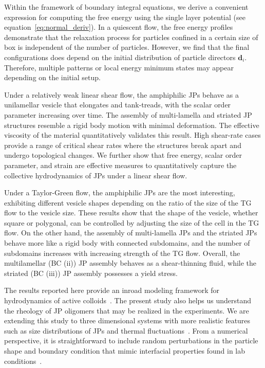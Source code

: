 \documentclass[prb,preprint,showpacs,preprintnumbers,amsmath,amssymb,longbibliography]{revtex4-1}
\newcommand{\dd}{\mathbf{d}}
\begin{document}
Within the framework of boundary integral equations, we derive a
convenient expression for computing the free energy using the single
layer potential (see equation~\eqref{eq:normal_deriv}). In a quiescent
flow, the free energy profiles demonstrate that the relaxation process
for particles confined in a certain size of box is independent of the
number of particles. However, we find that the final configurations does
depend on the initial distribution of particle directors $\dd_i$.
Therefore, multiple patterns or local energy minimum states may appear
depending on the initial setup.

Under a relatively weak linear shear flow, the amphiphilic JPs behave as
a unilamellar vesicle that elongates and tank-treads, with the scalar
order parameter increasing over time. The assembly of multi-lamella and
striated JP structures resemble a rigid body motion with minimal
deformation. The effective viscosity of the material quantitatively
validates this result. High shear-rate cases provide a range of critical
shear rates where the structures break apart and undergo topological
changes. We further show that free energy, scalar order parameter, and
strain are effective measures to quantitatively capture the collective hydrodynamics of
JPs under a linear shear flow.

Under a Taylor-Green flow, the amphiphilic JPs are the most interesting,
exhibiting different vesicle shapes depending on the ratio of the size
of the TG flow to the vesicle size. These results show that the shape of
the vesicle, whether square or polygonal, can be controlled by adjusting
the size of the cell in the TG flow. On the other hand, the assembly of
multi-lamella JPs and the striated JPs behave more like a rigid body
with connected subdomains, and the number of subdomains increases with
increasing strength of the TG flow. Overall, the multilamellar (BC (ii))
JP assembly behaves as a shear-thinning fluid, while the striated (BC
(iii)) JP assembly  possesses a yield stress.

The results reported here provide an inroad modeling framework for
hydrodynamics of active colloids~\cite{Meredithetal2022,
McGlassonBradley2021, Vutukuri2020, Mallory2017}. The present study also
helps us understand the rheology of JP oligomers that may be realized in
the experiments. We are extending this study to three dimensional
systems with more realistic features such as size distributions of JPs
and thermal fluctuations~\cite{kohl-cor-che-vee22}. From a numerical
perspective, it is straightforward to include random perturbations in
the particle shape and boundary condition that mimic interfacial
properties found in lab conditions~\cite{Bradley2016, Bradley2017,
Zarzaretal2015, doi:10.1021/la503455h}.
\end{document}
